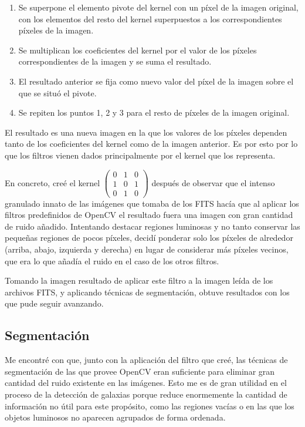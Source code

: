 \documentclass[a4paper,12pt]{article}
\begin{document}
\begin{enumerate}
\item Se superpone el elemento pivote del kernel con un píxel de la imagen original, con los elementos del resto del kernel superpuestos a los correspondientes píxeles de la imagen.
\item Se multiplican los coeficientes del kernel por el valor de los píxeles correspondientes de la imagen y se suma el resultado.
\item El resultado anterior se fija como nuevo valor del píxel de la imagen sobre el que se situó el pivote.
\item Se repiten los puntos 1, 2 y 3 para el resto de píxeles de la imagen original.
\end{enumerate}

El resultado es una nueva imagen en la que los valores de los píxeles dependen tanto de los coeficientes del kernel como de la imagen anterior. Es por esto por lo que los filtros vienen dados principalmente por el kernel que los representa.

En concreto, creé el kernel
$\begin{pmatrix}
0 & 1 & 0 \\
1 & 0 & 1 \\
0 & 1 & 0
\end{pmatrix}$
después de observar que el intenso granulado innato de las imágenes que tomaba de los FITS hacía que al aplicar los filtros predefinidos de OpenCV el resultado fuera una imagen con gran cantidad de ruido añadido. Intentando destacar regiones luminosas y no tanto conservar las pequeñas regiones de pocos píxeles, decidí ponderar solo los píxeles de alrededor (arriba, abajo, izquierda y derecha) en lugar de considerar más píxeles vecinos, que era lo que añadía el ruido en el caso de los otros filtros.

Tomando la imagen resultado de aplicar este filtro a la imagen leída de los archivos FITS, y aplicando técnicas de segmentación, obtuve resultados con los que pude seguir avanzando.

\subsection{Segmentación}

Me encontré con que, junto con la aplicación del filtro que creé, las técnicas de segmentación de las que provee OpenCV eran suficiente para eliminar gran cantidad del ruido existente en las imágenes. Esto me es de gran utilidad en el proceso de la detección de galaxias porque reduce enormemente la cantidad de información no útil para este propósito, como las regiones vacías o en las que los objetos luminosos no aparecen agrupados de forma ordenada.
\end{document}
